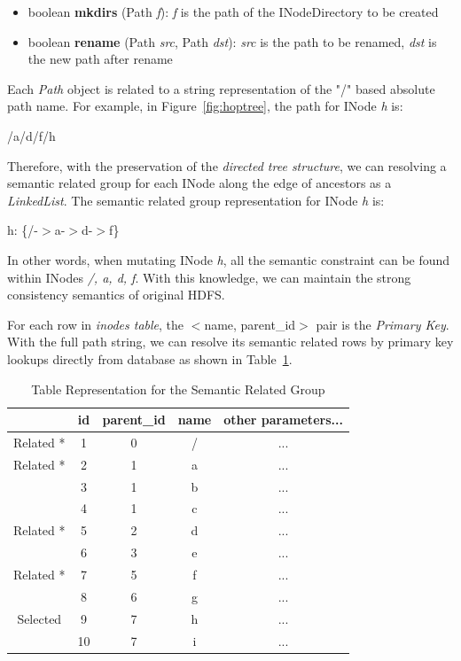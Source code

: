 \begin{itemize}[noitemsep]
	\item boolean \textbf{mkdirs} (Path \textit{f}): \textit{f} is the path of the INodeDirectory to be created
	\item boolean \textbf{rename} (Path \textit{src}, Path \textit{dst}): \textit{src} is the path to be renamed, \textit{dst} is the new path after rename
\end{itemize} 

\noindent Each \textit{Path} object is related to a string representation of the "/" based absolute path name. For example, in Figure~\ref{fig:hoptree}, the path for INode \textit{h} is: 
\begin{center}
	/a/d/f/h
\end{center}

\noindent Therefore, with the preservation of the \textit{directed tree structure}, we can resolving a semantic related group for each INode along the edge of ancestors as a \textit{LinkedList}. The semantic related group representation for INode \textit{h} is:
\begin{center}
	h: \{/-$>$a-$>$d-$>$f\}
\end{center}

\noindent In other words, when mutating INode \textit{h}, all the semantic constraint can be found within INodes \textit{/, a, d, f}. With this knowledge, we can maintain the strong consistency semantics of original HDFS.

\noindent For each row in \textit{inodes table}, the $<$name, parent\_id$>$ pair is the \textit{Primary Key}. With the full path string, we can resolve its semantic related rows by primary key lookups directly from database as shown in Table~\ref{table:semanticrelatedTable}.

\begin{table}[h]
	\centering
	\begin{tabular}{|c|c|c|c|c|}
		\hline
		~ & \textbf{id} & \textbf{parent\_id} & \textbf{name} & \textbf{other parameters...} \\ \hline
		Related * & 1 & 0 & / & ... \\ \hline
		Related * & 2 & 1 & a & ... \\ \hline
		~ & 3 & 1 & b & ... \\ \hline
		~ & 4 & 1 & c & ... \\ \hline
		Related * & 5 & 2 & d & ... \\ \hline
		~ & 6 & 3 & e & ... \\ \hline
		Related * & 7 & 5 & f & ... \\ \hline
		~ & 8 & 6 & g & ... \\ \hline
		Selected \checkmark & 9 & 7 & h & ... \\ \hline
		~ & 10 & 7 & i & ... \\ \hline
	\end{tabular}
	\caption{Table Representation for the Semantic Related Group}
	\label{table:semanticrelatedTable}
\end{table}

